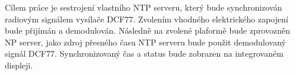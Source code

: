 Cílem práce je sestrojení vlastního NTP serveru, který bude synchronizován radiovým signálem vysílače DCF77. Zvolením vhodného elektrického zapojení bude přijímán a demodulován. Následně na zvolené plaformě bude zprovozněn NP server, jako zdroj přesného času NTP serveru bude použit demodulovaný signál DCF77. Synchronizovaný čas a status bude zobrazen na integrovaném displeji.
